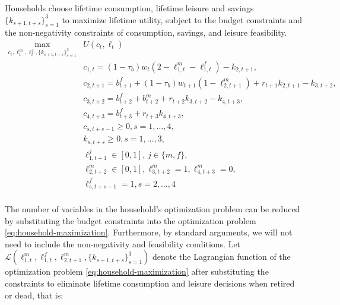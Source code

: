 \documentclass[ProjectUYA]{subfiles}
\begin{document}
Households choose lifetime consumption, lifetime leisure and savings $\{k_{s+1,t+s}\}_{s=1}^3$ to maximize lifetime utility, subject to the budget constraints and the non-negativity constraints of consumption, savings, and leisure feasibility. 
\begin{equation}
\label{eq:household-maximization}
	\begin{aligned}	
		\max_{c_t,\ell_t^m,\ell_t^f,\{k_{s+1,t+s}\}_{s=1}^3} & U(c_t,\ell_t) \\
	&c_{1,t}   = (1-\tau_b)w_t (2-\ell_{1,t}^m - \ell_{1,t}^f) -k_{2,t+1} ,\\
 	&c_{2,t+1}   = b_{t+1}^f+(1-\tau_b)w_{t+1} (1-\ell_{2,t+1}^m ) + r_{t+1}k_{2,t+1} -k_{3,t+2}  ,\\
 	&c_{3,t+2}   = b_{t+2}^f+ b_{t+2}^m  + r_{t+2}k_{3,t+2} -k_{4,t+3}  ,\\
 	&c_{4,t+3}  = b_{t+3}^f + r_{t+3}k_{4,t+3} ,\\
 	&c_{s,t+s-1}\geq 0, s=1,\ldots,4,\\
    &k_{s,t+s}\geq 0, s=1,\ldots,3,\\
    &\ell_{1,t+1}^j\in [0,1],\, j\in\{m,f\},\\
    &\ell_{2,t+2}^m\in[0,1], \ell_{3,t+2}^m=1,\ell_{4,t+3}^m=0,\\
    &\ell_{s,t+s-1}^f=1,s=2,\ldots,4\\
	\end{aligned}	
\end{equation}

The number of variables in the household's optimization problem  can be reduced by substituting the budget constraints into the optimization problem \eqref{eq:household-maximization}. Furthermore, by standard arguments, we will not need to include the non-negativity and feasibility conditions. Let $\mathcal{L}(\ell_{1,t}^m,\ell_{1,t}^f,\ell_{2,t+1}^m,\{k_{s+1,t+s}\}_{s=1}^3)$ denote the Lagrangian function of the optimization problem \eqref{eq:household-maximization} after substituting the constraints to eliminate lifetime consumption and leisure decisions when retired or dead,  that is:
\end{document}
